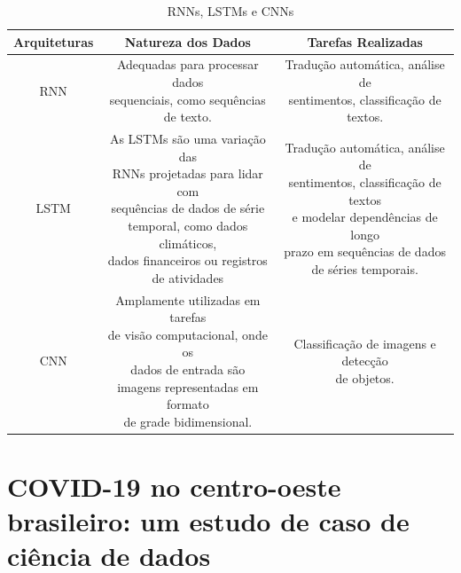 \begin{table}[!ht]
    \centering
    \begin{tabular}{|c|c|c|}
    \hline
        Arquiteturas & Natureza dos Dados & Tarefas Realizadas \\
    \hline
        RNN & \makecell{Adequadas para processar dados \\ sequenciais, como sequências \\ de texto.} & \makecell{Tradução automática, análise de \\ sentimentos, classificação de textos.} \\
    \hline
        LSTM & \makecell{As LSTMs são uma variação das \\ RNNs projetadas para lidar com \\ sequências de dados de série \\ temporal, como dados climáticos, \\ dados financeiros  ou registros \\ de atividades} & \makecell{Tradução automática, análise de \\ sentimentos, classificação de textos \\ e modelar dependências de longo \\ prazo em sequências de dados \\ de séries temporais.}\\
        
    \hline
        CNN & \makecell{Amplamente utilizadas em tarefas \\ de visão computacional, onde os \\ dados de entrada são \\ imagens representadas em formato \\ de grade bidimensional.} & \makecell{Classificação de imagens e detecção \\ de objetos.} \\
    \hline
    \end{tabular}
    \caption{RNNs, LSTMs e CNNs}
    \label{tab:my_label21}
\end{table}

\newpage
\section{COVID-19 no centro-oeste brasileiro: um estudo de caso de ciência de dados}

